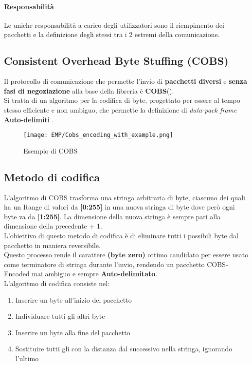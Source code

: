 \paragraph{Responsabilità} Le uniche responsabilità a carico degli utilizzatori sono il riempimento dei pacchetti e la definizione degli stessi tra i 2 estremi della comunicazione.

\subsection*{Consistent Overhead Byte Stuffing (COBS)}
Il protocollo di comunicazione che permette l’invio di \textbf{pacchetti diversi} e \textbf{senza fasi di negoziazione} alla base della libreria è \textbf{COBS}(\cite{COBS}).\\
Si tratta di un algoritmo per la codifica di byte, progettato per essere al tempo stesso efficiente e non ambiguo, che permette la definizione di \textit{data-pack frame} \textbf{Auto-delimiti} .

\begin{figure}[h]
	\centering
	\caption[Esempio di COBS]{Esempio di COBS}
	\texttt{[image: EMP/Cobs\_encoding\_with\_example.png]}
\end{figure}

\subsection{Metodo di codifica}
L'algoritmo di COBS trasforma una stringa arbitraria di byte, ciascuno dei quali ha un Range di valori da \textbf{[0:255]} in una nuova stringa di byte dove però ogni byte va da \textbf{[{\color{red}1}:255]}. La dimensione della nuova stringa è sempre pari alla dimensione della precedente + 1.\\
L'obiettivo di questo metodo di codifica è di eliminare tutti i possibili byte \zeroByte dal pacchetto in maniera reversibile.\\
Questo processo rende il carattere \textbf{\zeroByte (byte zero)} ottimo candidato per essere usato come terminatore di stringa durante l'invio, rendendo un pacchetto COBS-Encoded mai ambiguo e sempre \textbf{Auto-delimitato}.\\
L'algoritmo di codifica consiste nel:
\begin{enumerate} [itemsep=-3mm]
	\item Inserire un byte \zeroByte all'inizio del pacchetto
	\item Individuare tutti gli altri byte \zeroByte
	\item Inserire un byte \zeroByte alla fine del pacchetto
	\item Sostituire tutti gli \zeroByte con la distanza dal successivo \zeroByte nella stringa, ignorando l'ultimo
\end{enumerate}

